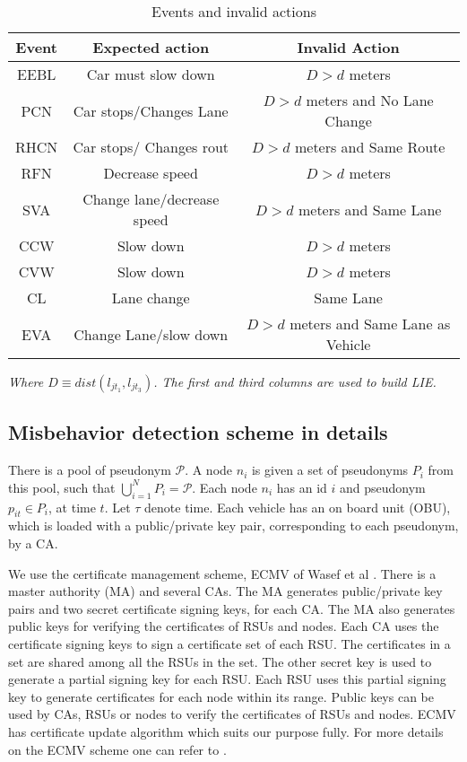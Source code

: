 \documentclass[conference]{IEEEtran}[10pt]
\begin{document}
\begin{table*}[!t]
\begin{center}
\caption{Events and invalid actions}
{\normalsize
\begin{tabular}{|c|c|c|}
\hline
Event & Expected action & Invalid Action\\
\hline
EEBL & Car must slow down & $D > d$ meters\\
PCN & Car stops/Changes Lane  & $D > d$ meters and No Lane Change\\
RHCN & Car stops/ Changes rout & $D > d $ meters and Same Route\\
RFN & Decrease speed & $D > d$ meters\\
SVA & Change lane/decrease speed & $D > d$ meters and Same Lane\\
CCW & Slow down & $D > d$ meters\\
CVW & Slow down & $D > d$ meters\\
CL & Lane change & Same Lane \\
EVA & Change Lane/slow down & $D > d$ meters and Same Lane as Vehicle\\
\hline
\end{tabular}
}
\end{center}
\begin{center} {\it Where $D \equiv dist(l_{jt_1},l_{jt_3})$. The first and third columns are used to build LIE.}\end{center}
\label{table:valid-invalid}
\end{table*}


\subsection{Misbehavior detection scheme in details}
There is a pool of pseudonym $\mathcal{P}$. 
A node $n_i$ is given a set of pseudonyms $P_i$ from this pool, such that 
$\bigcup_{i=1}^N P_i =\mathcal{P}$. 
Each node $n_i$ has an id $i$ and pseudonym $p_{it} \in P_i$, at time $t$. Let
 $\tau$ denote time. 
Each vehicle has an on board unit (OBU), 
which is loaded with a public/private key pair, corresponding to each pseudonym,  by a CA.

We use the certificate management scheme, ECMV of Wasef et al \cite{WJS08}. 
There is a master authority (MA) and several CAs. 
The MA generates public/private key pairs and two secret certificate signing keys, for each CA. 
The MA also generates public keys for verifying the certificates of RSUs and nodes. 
Each CA uses the certificate signing keys to sign a certificate set of each RSU. 
The certificates in a set are shared among all the RSUs in the set. 
The other secret key is used to generate  a partial signing key for each RSU. 
Each RSU uses this partial signing key to generate certificates for each node within its range. 
Public keys can be used by CAs, RSUs or nodes to verify the certificates of RSUs and nodes. 
ECMV has certificate update algorithm which suits our purpose fully. 
For more details on the ECMV scheme one can refer to \cite{WJS08}. 
\end{document}
